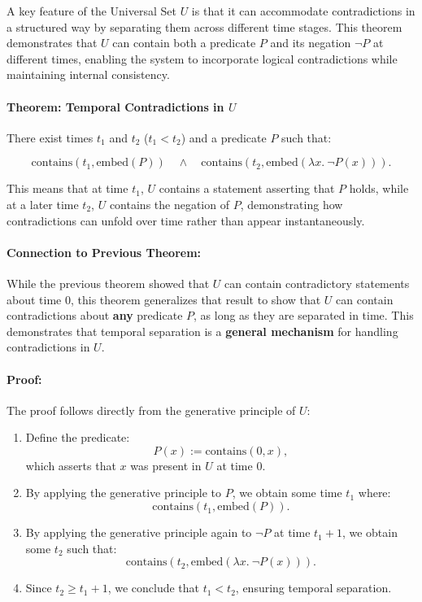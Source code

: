 \documentclass[12pt]{article}
\begin{document}
A key feature of the Universal Set \( U \) is that it can accommodate contradictions in a structured way by separating them across different time stages. This theorem demonstrates that \( U \) can contain both a predicate \( P \) and its negation \( \neg P \) at different times, enabling the system to incorporate logical contradictions while maintaining internal consistency.

\paragraph{Theorem: Temporal Contradictions in \( U \)}
There exist times \( t_1 \) and \( t_2 \) (\( t_1 < t_2 \)) and a predicate \( P \) such that:

\begin{equation}
    \text{contains}(t_1, \text{embed}(P)) \quad \wedge \quad
    \text{contains}(t_2, \text{embed}(\lambda x.\ \neg P(x))).
\end{equation}

This means that at time \( t_1 \), \( U \) contains a statement asserting that \( P \) holds, while at a later time \( t_2 \), \( U \) contains the negation of \( P \), demonstrating how contradictions can unfold over time rather than appear instantaneously.

\paragraph{Connection to Previous Theorem:}
While the previous theorem showed that \( U \) can contain contradictory statements about time \( 0 \), this theorem generalizes that result to show that \( U \) can contain contradictions about \textbf{any} predicate \( P \), as long as they are separated in time. This demonstrates that temporal separation is a \textbf{general mechanism} for handling contradictions in \( U \).

\paragraph{Proof:}
The proof follows directly from the generative principle of \( U \):

\begin{enumerate}
    \item Define the predicate:
    \[
    P(x) := \text{contains}(0, x),
    \]
    which asserts that \( x \) was present in \( U \) at time \( 0 \).
    \item By applying the generative principle to \( P \), we obtain some time \( t_1 \) where:
    \[
    \text{contains}(t_1, \text{embed}(P)).
    \]
    \item By applying the generative principle again to \( \neg P \) at time \( t_1 + 1 \), we obtain some \( t_2 \) such that:
    \[
    \text{contains}(t_2, \text{embed}(\lambda x.\ \neg P(x))).
    \]
    \item Since \( t_2 \geq t_1 + 1 \), we conclude that \( t_1 < t_2 \), ensuring temporal separation.
\end{enumerate}
\end{document}
